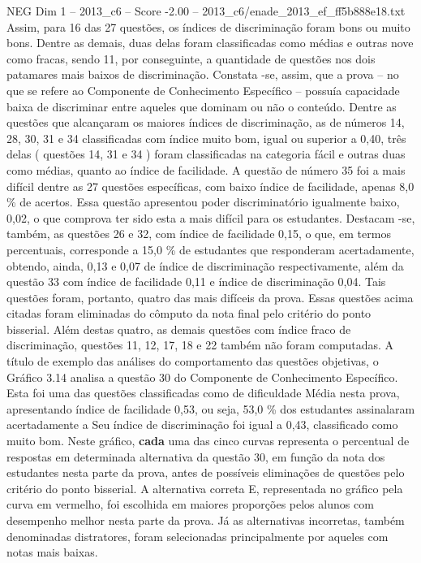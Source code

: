 \begin{textsample}{NEG Dim 1 – 2013\_c6 – Score -2.00 – 2013\_c6/enade\_2013\_ef\_ff5b888e18.txt}
Assim, para 16 das 27 questões, os índices de discriminação foram bons ou muito bons.
Dentre as demais, duas delas foram classificadas como médias e outras nove como fracas, sendo 11, por conseguinte, a quantidade de questões nos dois patamares mais baixos de discriminação.
Constata -se, assim, que a prova – no que se refere ao Componente de Conhecimento Específico – possuía capacidade baixa de discriminar entre aqueles que dominam ou não o conteúdo.
Dentre as questões que alcançaram os maiores índices de discriminação, as de números 14, 28, 30, 31 e 34 classificadas com índice muito bom, igual ou superior a 0,40, três delas ( questões 14, 31 e 34 ) foram classificadas na categoria fácil e outras duas como médias, quanto ao índice de facilidade.
A questão de número 35 foi a mais difícil dentre as 27 questões específicas, com baixo índice de facilidade, apenas 8,0 \% de acertos.
Essa questão apresentou poder discriminatório igualmente baixo, 0,02, o que comprova ter sido esta a mais difícil para os estudantes.
Destacam -se, também, as questões 26 e 32, com índice de facilidade 0,15, o que, em termos percentuais, corresponde a 15,0 \% de estudantes que responderam acertadamente, obtendo, ainda, 0,13 e 0,07 de índice de discriminação respectivamente, além da questão 33 com índice de facilidade 0,11 e índice de discriminação 0,04.
Tais questões foram, portanto, quatro das mais difíceis da prova.
Essas questões acima citadas foram eliminadas do cômputo da nota final pelo critério do ponto bisserial.
Além destas quatro, as demais questões com índice fraco de discriminação, questões 11, 12, 17, 18 e 22 também não foram computadas.
A título de exemplo das análises do comportamento das questões objetivas, o Gráfico 3.14 analisa a questão 30 do Componente de Conhecimento Específico.
Esta foi uma das questões classificadas como de dificuldade Média nesta prova, apresentando índice de facilidade 0,53, ou seja, 53,0 \% dos estudantes assinalaram acertadamente a Seu índice de discriminação foi igual a 0,43, classificado como muito bom.
Neste gráfico, \textbf{cada} uma das cinco curvas representa o percentual de respostas em determinada alternativa da questão 30, em função da nota dos estudantes nesta parte da prova, antes de possíveis eliminações de questões pelo critério do ponto bisserial.
A alternativa correta E, representada no gráfico pela curva em vermelho, foi escolhida em maiores proporções pelos alunos com desempenho melhor nesta parte da prova.
Já as alternativas incorretas, também denominadas distratores, foram selecionadas principalmente por aqueles com notas mais baixas.

\end{textsample}

